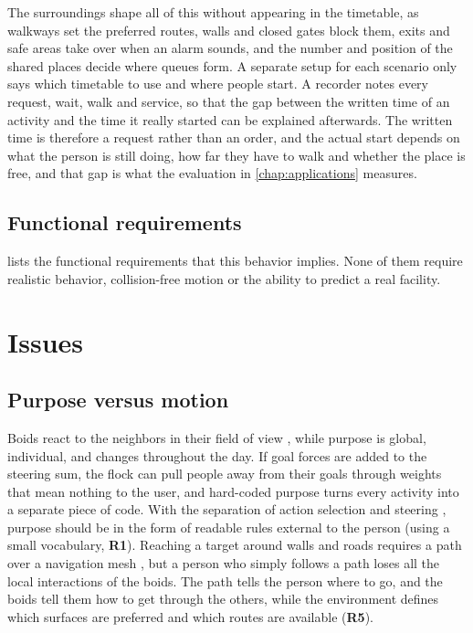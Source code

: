 The surroundings shape all of this without appearing in the timetable, as walkways set the preferred routes, walls and closed gates block them, exits and safe areas take over when an alarm sounds, and the number and position of the shared places decide where queues form. A separate setup for each scenario only says which timetable to use and where people start. A recorder notes every request, wait, walk and service, so that the gap between the written time of an activity and the time it really started can be explained afterwards. The written time is therefore a request rather than an order, and the actual start depends on what the person is still doing, how far they have to walk and whether the place is free, and that gap is what the evaluation in \cref{chap:applications} measures.

\subsection{Functional requirements}\label{sec:problem-requirements}

 lists the functional requirements that this behavior implies. None of them require realistic behavior, collision-free motion or the ability to predict a real facility.

\section{Issues}\label{sec:problem-challenges}

\subsection{Purpose versus motion}\label{sub:challenge-purpose}

Boids react to the neighbors in their field of view \citep{reynolds1987flocks}, while purpose is global, individual, and changes throughout the day. If goal forces are added to the steering sum, the flock can pull people away from their goals through weights that mean nothing to the user, and hard-coded purpose turns every activity into a separate piece of code. With the separation of action selection and steering \citep{reynolds1999steering}, purpose should be in the form of readable rules external to the person (using a small vocabulary, \textbf{R1}). Reaching a target around walls and roads requires a path over a navigation mesh \citep{snook2000simplified,mononen2009recast}, but a person who simply follows a path loses all the local interactions of the boids. The path tells the person where to go, and the boids tell them how to get through the others, while the environment defines which surfaces are preferred and which routes are available (\textbf{R5}).

